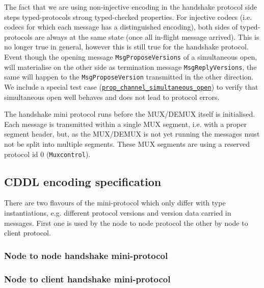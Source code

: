 The fact that we are using non-injective encoding in the handshake protocol
side steps typed-protocols strong typed-checked properties.  For injective
codecs (i.e. codecs for which each message has a distinguished encoding), both
sides of typed-protocols are always at the same state (once all in-flight
message arrived).  This is no longer true in general, however this is still
true for the handshake protocol.  Event though the opening message
\texttt{MsgProposeVersions} of a simultaneous open, will materialise on the
other side as termination message \texttt{MsgReplyVersions}, the same will
happen to the \texttt{MsgProposeVersion} transmitted in the other direction.
We include a special test case
(\href{https://github.com/input-output-hk/ouroboros-network/blob/master/ouroboros-network/protocol-tests/Ouroboros/Network/Protocol/Handshake/Test.hs\#L551}{\texttt{prop\_channel\_simultaneous\_open}})
to verify that simultaneous open well behaves and does not lead to protocol
errors.

The handshake mini protocol runs before the MUX/DEMUX itself is initialised.
Each message is transmitted within a single MUX segment, i.e. with a proper
segment header, but, as the MUX/DEMUX is not yet running the messages must not
be split into multiple segments.  These MUX segments are using a reserved
protocol id $0$ (\texttt{Muxcontrol}).

\subsection{CDDL encoding specification}\label{handshake-cddl}
There are two flavours of the mini-protocol which only differ with type
instantiations, e.g. different protocol versions and version data carried in
messages.  First one is used by the node to node protocol the other by node to
client protocol.

\subsubsection{Node to node handshake mini-protocol}

\subsubsection{Node to client handshake mini-protocol}


